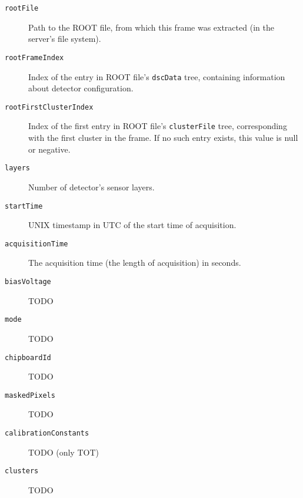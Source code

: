 \begin{description}
	\item[\texttt{rootFile}]
	Path to the ROOT file, from which this frame was extracted (in the server's file system).

	\item[\texttt{rootFrameIndex}]
	Index of the entry in ROOT file's \texttt{dscData} tree, containing information about detector configuration.

	\item[\texttt{rootFirstClusterIndex}]
	Index of the first entry in ROOT file's \texttt{clusterFile} tree, corresponding with the first cluster in the frame. If no such entry exists, this value is null or negative.

	\item[\texttt{layers}]
	Number of detector's sensor layers.

	\item[\texttt{startTime}]
	UNIX timestamp in UTC of the start time of acquisition.

	\item[\texttt{acquisitionTime}]
	The acquisition time (the length of acquisition) in seconds.

	\item[\texttt{biasVoltage}]
	TODO

	\item[\texttt{mode}]
	TODO

	\item[\texttt{chipboardId}]
	TODO

	\item[\texttt{maskedPixels}]
	TODO

	\item[\texttt{calibrationConstants}]
	TODO (only TOT)

	\item[\texttt{clusters}]
	TODO
\end{description}

